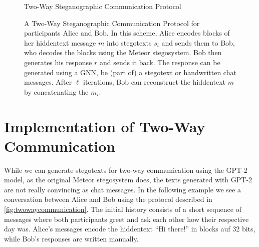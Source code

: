 \begin{figure}[htbp]
	\centering
	\begin{msc}[instance distance=4cm,action width=5cm]{Two-Way Steganographic Communication Protocol}
		\nextlevel[2]
		\nextlevel[3]
		\nextlevel[2]
		\nextlevel[3]
		\nextlevel
		\nextlevel[2]
		\nextlevel[3]
		\nextlevel
		\nextlevel[2]
		\nextlevel[3]
		\nextlevel
	\end{msc}
	\caption{
	A Two-Way Steganographic Communication Protocol for participants Alice and Bob.
	In this scheme, Alice encodes blocks of her hiddentext message $m$ into stegotexts $s_i$ and sends them to Bob, who decodes the blocks using the Meteor stegosystem.
	Bob then generates his response $r$ and sends it back.
	The response can be generated using a GNN, be (part of) a stegotext or handwritten chat messages.
	After $\ell$ iterations, Bob can reconstruct the hiddentext $m$ by concatenating the $m_i$.
	}
	\label{fig:twowaycommunication}
\end{figure}

\section{Implementation of Two-Way Communication}
While we can generate stegotexts for two-way communication using the GPT-2 model, as the original Meteor stegosystem does, the texts generated with GPT-2 are not really convincing as chat messages. 
In the following example we see a conversation between Alice and Bob using the protocol described in \autoref{fig:twowaycommunication}.
The initial history consists of a short sequence of messages where both participants greet and ask each other how their respective day was.
Alice's messages encode the hiddentext ``Hi there!'' in blocks auf 32 bits, while Bob's responses are written manually.


